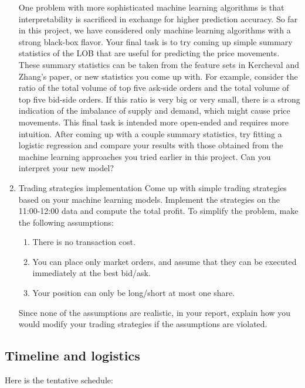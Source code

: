 \documentclass[11pt, oneside]{article}   	%
\begin{document}
\begin{enumerate}
One problem with more sophisticated machine learning algorithms is that interpretability 
is sacrificed in exchange for higher prediction accuracy. So far in this project, we have 
considered only machine learning algorithms with a strong black-box flavor. Your final 
task is to try coming up simple summary statistics of the LOB that are useful for 
predicting the price movements. These summary statistics can be taken from the 
feature sets in Kercheval and Zhang's paper, or new statistics you come up with. For 
example, consider the ratio of the total volume of top five ask-side orders and the 
total volume of top five bid-side orders. If this ratio is very big or very small, there is a 
strong indication of the imbalance of supply and demand, which might cause price 
movements. This final task is intended more open-ended and requires more intuition. 
After coming up with a couple summary statistics, try fitting a logistic regression and 
compare your results with those obtained from the machine learning approaches you 
tried earlier in this project. Can you interpret your new model?

\item Trading strategies implementation
Come up with simple trading strategies based on your machine learning models. 
Implement the strategies on the 11:00-12:00 data and compute the total profit. 
To simplify the problem, make the following assumptions:
\begin{enumerate}
\item There is no transaction cost.
\item You can place only market orders, and assume that they can be executed immediately at the best bid/ask.
\item Your position can only be long/short at most one share.
\end{enumerate}
Since none of the assumptions are realistic, in your report, explain how you would modify your trading strategies if the assumptions are violated. 

\end{enumerate}


\subsection*{Timeline and logistics}

Here is the tentative schedule:
\end{document}
